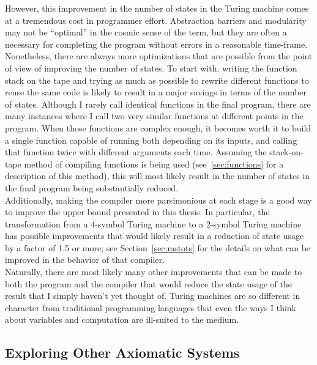 \documentclass{report}
\begin{document}
However, this improvement in the number of states in the Turing machine comes at a tremendous cost in programmer effort. Abstraction barriers and modularity may not be ``optimal'' in the cosmic sense of the term, but they are often a necessary for completing the program without errors in a reasonable time-frame. \\

Nonetheless, there are always more optimizations that are possible from the point of view of improving the number of states. To start with, writing the function stack on the tape and trying as much as possible to rewrite different functions to reuse the same code is likely to result in a major savings in terms of the number of states. Although I rarely call identical functions in the final program, there are many instances where I call two very similar functions at different points in the program. When those functions are complex enough, it becomes worth it to build a single function capable of running both depending on its inputs, and calling that function twice with different arguments each time. Assuming the stack-on-tape method of compiling functions is being used (see~\ref{sec:functions} for a description of this method), this will most likely result in the number of states in the final program being substantially reduced. \\

Additionally, making the compiler more parsimonious at each stage is a good way to improve the upper bound presented in this thesis. In particular, the transformation from a 4-symbol Turing machine to a 2-symbol Turing machine has possible improvements that would likely result in a reduction of state usage by a factor of 1.5 or more; see Section~\ref{sec:mstots} for the details on what can be improved in the behavior of that compiler. \\

Naturally, there are most likely many other improvements that can be made to both the program and the compiler that would reduce the state usage of the result that I simply haven't yet thought of. Turing machines are so different in character from traditional programming languages that even the ways I think about variables and computation are ill-suited to the medium.

\subsection{Exploring Other Axiomatic Systems}
\end{document}
